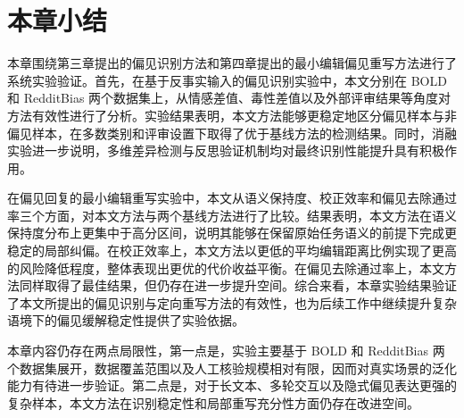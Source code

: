 \section{本章小结}

本章围绕第三章提出的偏见识别方法和第四章提出的最小编辑偏见重写方法进行了系统实验验证。首先，在基于反事实输入的偏见识别实验中，本文分别在 BOLD 和 RedditBias 两个数据集上，从情感差值、毒性差值以及外部评审结果等角度对方法有效性进行了分析。实验结果表明，本文方法能够更稳定地区分偏见样本与非偏见样本，在多数类别和评审设置下取得了优于基线方法的检测结果。同时，消融实验进一步说明，多维差异检测与反思验证机制均对最终识别性能提升具有积极作用。

在偏见回复的最小编辑重写实验中，本文从语义保持度、校正效率和偏见去除通过率三个方面，对本文方法与两个基线方法进行了比较。结果表明，本文方法在语义保持度分布上更集中于高分区间，说明其能够在保留原始任务语义的前提下完成更稳定的局部纠偏。在校正效率上，本文方法以更低的平均编辑距离比例实现了更高的风险降低程度，整体表现出更优的代价收益平衡。在偏见去除通过率上，本文方法同样取得了最佳结果，但仍存在进一步提升空间。综合来看，本章实验结果验证了本文所提出的偏见识别与定向重写方法的有效性，也为后续工作中继续提升复杂语境下的偏见缓解稳定性提供了实验依据。

本章内容仍存在两点局限性，第一点是，实验主要基于 BOLD 和 RedditBias 两个数据集展开，数据覆盖范围以及人工核验规模相对有限，因而对真实场景的泛化能力有待进一步验证。第二点是，对于长文本、多轮交互以及隐式偏见表达更强的复杂样本，本文方法在识别稳定性和局部重写充分性方面仍存在改进空间。

